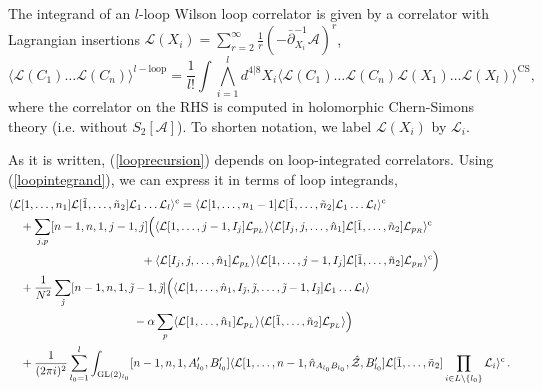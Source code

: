 \documentclass[12pt]{article}
\numberwithin{equation}{section}
\begin{document}
The integrand of an $l$-loop Wilson loop correlator is given by a correlator with Lagrangian insertions $\mathcal{L}(X_i)=\sum_{r=2}^\infty \frac{1}{r}(-\bar{\partial}_{X_i}^{-1}\mathcal{A})^r$,
\begin{equation}
    \langle \mathcal{L}(C_1) \hdots \mathcal{L}(C_n)\rangle^{l-\textrm{loop}}=\frac{1}{l!}\int \bigwedge_{i=1}^l d^{4|8}X_i \langle  \mathcal{L}(C_1) \hdots \mathcal{L}(C_n) \mathcal{L}(X_1) \hdots \mathcal{L}(X_l)\rangle^{\textrm{CS}},
    \label{loopintegrand}
\end{equation}
where the correlator on the RHS is computed in holomorphic Chern-Simons theory (i.e. without $S_2[\mathcal{A}]$). To shorten notation, we label $\mathcal{L}(X_i)$ by $\mathcal{L}_i$. 

As it is written, (\ref{looprecursion}) depends on loop-integrated correlators. Using (\ref{loopintegrand}), we can express it in terms of loop integrands,
\begin{align}
    &\langle \mathcal{L}[1,\ldots,n_1] \mathcal{L}[\tilde{1},\ldots,\tilde{n}_2]\mathcal{L}_1\hdots\mathcal{L}_l\rangle^{\rm c} = \langle \mathcal{L}[1,\ldots,n_1-1] \mathcal{L}[\tilde{1},\ldots,\tilde{n}_2]\mathcal{L}_1\hdots\mathcal{L}_l\rangle^{\rm c}  \notag \\
    &\quad + \sum_{j,p} [n-1,n,1,j-1,j] \Bigl(\langle \mathcal{L}[1,\ldots,j-1,I_j]\mathcal{L}_{p_L}\rangle \langle \mathcal{L}[I_j,j,\ldots,\hat{n}_1] \mathcal{L}[\tilde{1},\ldots,\tilde{n}_2]\mathcal{L}_{p_R}\rangle^{\rm c}  \notag \\
    &  \qquad \qquad \qquad \qquad \qquad \quad \,\,\, +\langle \mathcal{L}[I_j,j,\ldots,\hat{n}_1]\mathcal{L}_{p_L} \rangle \langle \mathcal{L}[1,\ldots,j-1,I_j] \mathcal{L}[\tilde{1},\ldots,\tilde{n}_2]\mathcal{L}_{p_R}\rangle^{\rm c} \Bigr) \notag \\
    & \quad +\frac{1}{N^2} \sum_{\tilde{\jmath}} [n-1,n,1,\tilde{\jmath}-1,\tilde{\jmath}] \Bigl( \langle \mathcal{L}[1,\ldots,\hat{n}_1,I_{\tilde{\jmath}},\tilde{\jmath},\ldots,\tilde{\jmath}-1,I_{\tilde{\jmath}}]\mathcal{L}_1 \hdots \mathcal{L}_l\rangle\\
    & \qquad \qquad \qquad \qquad \qquad \,\,\,\,\,- \alpha \sum_{p} \langle \mathcal{L}[1,\ldots,\hat{n}_1]\mathcal{L}_{p_L} \rangle \langle \mathcal{L}[\tilde{1},\ldots,\tilde{n}_2]\mathcal{L}_{p_L}\rangle\Bigr)  \notag \\
    &\quad +\frac{1}{(2 \pi i)^2} \sum_{l_0=1}^l\int_{\textrm{GL}(2)_{l_0}}  [n-1,n,1,A'_{l_0},B'_{l_0}] \langle \mathcal{L}[1,\ldots,n-1,\hat{n}_{A_{l_0}B_{l_0}},\hat{\mathcal{Z}},B'_{l_0}] \mathcal{L}[\tilde{1},\ldots,\tilde{n}_2]\prod_{i\in L\backslash\{l_0\}} \mathcal{L}_{i}\rangle^{\rm c} \, .
    \label{looprecursionintegrand}
\end{align}
\end{document}
